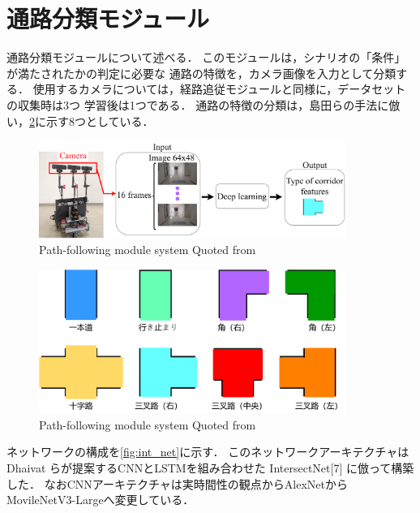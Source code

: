 \section{通路分類モジュール}
通路分類モジュールについて述べる．
このモジュールは，シナリオの「条件」が満たされたかの判定に必要な
通路の特徴を，カメラ画像を入力として分類する．
使用するカメラについては，経路追従モジュールと同様に，データセットの収集時は3つ
学習後は1つである．
通路の特徴の分類は，島田らの手法に倣い，\ref{fig:class}に示す8つとしている．
\begin{figure}[htbp]
    \centering
     \includegraphics[width=100mm]{images/pdf/intersection_abs.pdf}
     \caption{Path-following module system Quoted from \cite{haruyama2023}}
     \label{fig:intersection_abs}
\end{figure}
\begin{figure}[htbp]
    \centering
     \includegraphics[width=100mm]{images/pdf/class.pdf}
     \caption{Path-following module system Quoted from \cite{haruyama2023}}
     \label{fig:class}
\end{figure}
\newpage

ネットワークの構成を\ref{fig:int_net}に示す．
このネットワークアーキテクチャはDhaivat らが提案するCNNとLSTMを組み合わせた
IntersectNet[7] に倣って構築した．
なおCNNアーキテクチャは実時間性の観点からAlexNetからMovileNetV3-Largeへ変更している．

